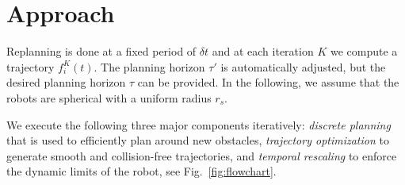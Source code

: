 \documentclass{svproc}
\begin{document}

\section{Approach}


Replanning is done at a fixed period of $\delta t$ and at each iteration $K$ we compute a trajectory $f^K_i(t)$.
The planning horizon $\tau'$ is automatically adjusted, but the desired planning horizon $\tau$ can be provided.
In the following, we assume that the robots are spherical with a uniform radius $r_s$.

We execute the following three major components iteratively: \emph{discrete planning} that is used to efficiently plan around new obstacles, \emph{trajectory optimization} to generate smooth and collision-free trajectories, and \emph{temporal rescaling} to enforce the dynamic limits of the robot, see Fig.~\ref{fig:flowchart}.


\end{document}
